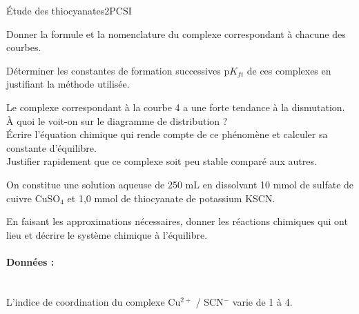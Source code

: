 \begin{exercise}{\'Etude des thiocyanates}{2}{PCSI}
\begin{questions}
\question Donner la formule et la nomenclature du complexe correspondant à chacune des courbes.

\question Déterminer les constantes de formation successives p$K_{fi}$ de ces complexes en justifiant la méthode utilisée.

\question Le complexe correspondant à la courbe 4 a une forte tendance à la dismutation. À quoi le voit-on sur le diagramme de distribution ? \\
Écrire l'équation chimique qui rende compte de ce phénomène et calculer sa constante d’équilibre. \\
Justifier rapidement que ce complexe soit peu stable comparé aux autres.

\begin{EnvUplevel}
    On constitue une solution aqueuse de 250 mL en dissolvant 10 mmol de sulfate de cuivre CuSO$_4$ et 1,0 mmol de thiocyanate de potassium KSCN.
\end{EnvUplevel}

 En faisant les approximations nécessaires, donner les réactions chimiques qui ont lieu et décrire le système chimique à l'équilibre.

\end{questions}

\paragraph{Données : }~\\
L’indice de coordination du complexe Cu$^{2+}$ / SCN$^{-}$ varie de 1 à 4.

\end{exercise}

